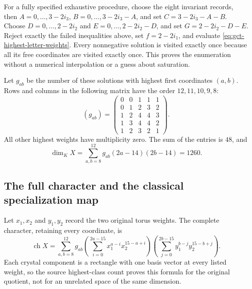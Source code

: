 For a fully specified exhaustive procedure, choose the eight invariant
records, then $A=0,\ldots,3-2i_3$,
$B=0,\ldots,3-2i_3-A$, and set $C=3-2i_3-A-B$.
Choose $D=0,\ldots,2-2i_2$ and
$E=0,\ldots,2-2i_2-D$, and set $G=2-2i_2-D-E$.
Reject exactly the failed inequalities above, set $f=2-2i_1$,
and evaluate \eqref{eq:gct-highest-letter-weights}.
Every nonnegative solution is visited exactly once because all its
free coordinates are visited exactly once. This proves the enumeration
without a numerical interpolation or a guess about saturation.

Let $g_{ab}$ be the number of these solutions with highest first
coordinates $(a,b)$. Rows and columns in the following matrix have
the order $12,11,10,9,8$:
\begin{equation}
 (g_{ab})=
 \begin{pmatrix}
 0&0&1&1&1\\0&1&2&3&2\\1&2&4&4&3\\
 1&3&4&4&2\\1&2&3&2&1
 \end{pmatrix}.
 \label{eq:gct-full-multiplicity-matrix}
\end{equation}
All other highest weights have multiplicity zero. The sum of the
entries is $48$, and
\begin{equation}
 \dim_K X=\sum_{a,b=8}^{12}g_{ab}(2a-14)(2b-14)=1260.
 \label{eq:gct-full-dimension}
\end{equation}

\subsection{The full character and the classical specialization map}

Let $x_1,x_2$ and $y_1,y_2$ record the two original torus weights.
The complete character, retaining every coordinate, is
\begin{equation}
 \operatorname{ch}X=
 \sum_{a,b=8}^{12}g_{ab}
 \left(\sum_{i=0}^{2a-15}x_1^{a-i}x_2^{15-a+i}\right)
 \left(\sum_{j=0}^{2b-15}y_1^{b-j}y_2^{15-b+j}\right).
 \label{eq:gct-full-character-polynomial}
\end{equation}
Each crystal component is a rectangle with one basis vector at
every listed weight, so the source highest-class count proves this
formula for the original quotient, not for an unrelated space of
the same dimension.

